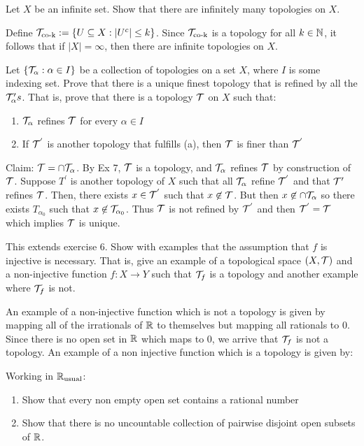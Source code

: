 \begin{ExerciseList}
    \Exercise[difficulty=1] Let $X$ be an infinite set. Show that %
    there are infinitely many topologies on $X$.

    \Answer Define $\T_{\text{co-k}} := \{U\subseteq X: %
    |U^c|\leq k\}$. Since $\mathcal{T}_{\text{co-k}}$ is a topology for all %
    $k\in\mathbb{N}$, it follows that if $|X|=\infty$, then there are %
    infinite topologies on $X$.

    \Exercise[difficulty=1] Let $\{\mathcal{T}_{\alpha} : \alpha\in I\}$ be %
    a collection of topologies on a set $X$, where $I$ is some %
    indexing set. Prove that there is a unique finest topology that %
    is refined by all the $\mathcal{T}_{\alpha}'s$. That is, prove that %
    there is a topology $\mathcal{T}$ on $X$ such that:
    \begin{enumerate}
        \item $\mathcal{T}_{\alpha}$ refines $\mathcal{T}$ for every $\alpha\in I$
        \item If $\mathcal{T}^{'}$ is another topology that fulfills (a), %
            then $\mathcal{T}$ is finer than $\mathcal{T}^{'}$
    \end{enumerate}

    \Answer Claim: $\mathcal{T} = \cap \mathcal{T}_{\alpha}$. By Ex 7, $\mathcal{T}$ is a %
    topology, and $\mathcal{T}_{\alpha}$ refines $\mathcal{T}$ by construction of %
    $\mathcal{T}$. Suppose $T^{'}$ is another topology of $X$ such that %
    all $\mathcal{T}_{\alpha}$ refine $\mathcal{T}^{'}$ and that $\mathcal{T}{'}$ refines %
    $\mathcal{T}$. Then, there exists $x\in\mathcal{T}^{'}$ such that $x\not\in\mathcal{T}$.
    But then $x\not\in \cap \mathcal{T}_{\alpha}$ so there exists %
    $T_{\alpha_0}$ such that $x\not\in\mathcal{T}_{\alpha_0}$. Thus $\mathcal{T}$ %
    is not refined by $\mathcal{T}^{'}$ and then $\mathcal{T}^{'}=\mathcal{T}$ which implies %
    $\mathcal{T}$ is unique.

    \Exercise[difficulty=1] This extends exercise 6. Show with %
    examples that the assumption that $f$ is injective is necessary.
    That is, give an example of a topological space $(X,\mathcal{T})$ and %
    a non-injective function $f:X\to Y$ such that $\mathcal{T}_f$ is a %
    topology and another example where $\mathcal{T}_f$ is not.

    \Answer An example of a non-injective function which is not a %
    topology is given by mapping all of the irrationals of $\mathbb{R}$ %
    to themselves but mapping all rationals to 0. Since there is %
    no open set in $\mathbb{R}$ which maps to 0, we arrive that $\mathcal{T}_f$ %
    is not a topology. An example of a non injective function which %
    is a topology is given by:

    \Exercise[difficulty=3] Working in $\mathbb{R}_{\text{usual}}$: 
    \begin{enumerate}
        \item Show that every non empty open set contains a %
            rational number
        \item Show that there is no uncountable collection of %
            pairwise disjoint open subsets of $\mathbb{R}$.
    \end{enumerate}


\end{ExerciseList}
